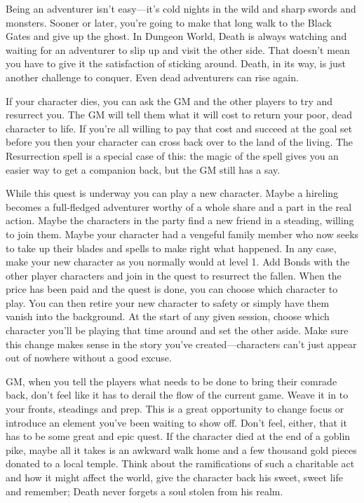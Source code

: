 Being an adventurer isn't easy—it's cold nights in the wild and sharp swords and monsters. Sooner or later, you're going to make that long walk to the Black Gates and give up the ghost. In Dungeon World, Death is always watching and waiting for an adventurer to slip up and visit the other side. That doesn't mean you have to give it the satisfaction of sticking around. Death, in its way, is just another challenge to conquer. Even dead adventurers can rise again.

 

If your character dies, you can ask the GM and the other players to try and resurrect you. The GM will tell them what it will cost to return your poor, dead character to life. If you're all willing to pay that cost and succeed at the goal set before you then your character can cross back over to the land of the living. The Resurrection spell is a special case of this: the magic of the spell gives you an easier way to get a companion back, but the GM still has a say.

 

While this quest is underway you can play a new character. Maybe a hireling becomes a full-fledged adventurer worthy of a whole share and a part in the real action. Maybe the characters in the party find a new friend in a steading, willing to join them. Maybe your character had a vengeful family member who now seeks to take up their blades and spells to make right what happened. In any case, make your new character as you normally would at level 1. Add Bonds with the other player characters and join in the quest to resurrect the fallen. When the price has been paid and the quest is done, you can choose which character to play. You can then retire your new character to safety or simply have them vanish into the background. At the start of any given session, choose which character you'll be playing that time around and set the other aside. Make sure this change makes sense in the story you've created—characters can't just appear out of nowhere without a good excuse.

 

GM, when you tell the players what needs to be done to bring their comrade back, don't feel like it has to derail the flow of the current game. Weave it in to your fronts, steadings and prep. This is a great opportunity to change focus or introduce an element you've been waiting to show off. Don't feel, either, that it has to be some great and epic quest. If the character died at the end of a goblin pike, maybe all it takes is an awkward walk home and a few thousand gold pieces donated to a local temple. Think about the ramifications of such a charitable act and how it might affect the world, give the character back his sweet, sweet life and remember; Death never forgets a soul stolen from his realm.

